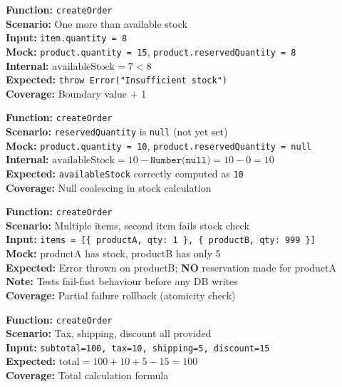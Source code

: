 \documentclass[12pt,onecolumn]{IEEEtran}
\begin{document}
\textbf{Function:} \texttt{createOrder} \\
\textbf{Scenario:} One more than available stock \\
\textbf{Input:} \texttt{item.quantity = 8} \\
\textbf{Mock:} \texttt{product.quantity = 15}, \texttt{product.reservedQuantity = 8} \\
\textbf{Internal:} $\text{availableStock} = 7 < 8$ \\
\textbf{Expected:} \texttt{throw Error("Insufficient stock")} \\
\textbf{Coverage:} Boundary value + 1



\textbf{Function:} \texttt{createOrder} \\
\textbf{Scenario:} \texttt{reservedQuantity} is \texttt{null} (not yet set) \\
\textbf{Mock:} \texttt{product.quantity = 10}, \texttt{product.reservedQuantity = null} \\
\textbf{Internal:} $\text{availableStock} = 10 - \texttt{Number(null)} = 10 - 0 = 10$ \\
\textbf{Expected:} \texttt{availableStock} correctly computed as \texttt{10} \\
\textbf{Coverage:} Null coalescing in stock calculation



\textbf{Function:} \texttt{createOrder} \\
\textbf{Scenario:} Multiple items, second item fails stock check \\
\textbf{Input:} \texttt{items = [\{ productA, qty: 1 \}, \{ productB, qty: 999 \}]} \\
\textbf{Mock:} productA has stock, productB has only 5 \\
\textbf{Expected:} Error thrown on productB; \textbf{NO} reservation made for productA \\
\textbf{Note:} Tests fail-fast behaviour before any DB writes \\
\textbf{Coverage:} Partial failure rollback (atomicity check)



\textbf{Function:} \texttt{createOrder} \\
\textbf{Scenario:} Tax, shipping, discount all provided \\
\textbf{Input:} \texttt{subtotal=100, tax=10, shipping=5, discount=15} \\
\textbf{Expected:} $\text{total} = 100 + 10 + 5 - 15 = 100$ \\
\textbf{Coverage:} Total calculation formula
\end{document}

